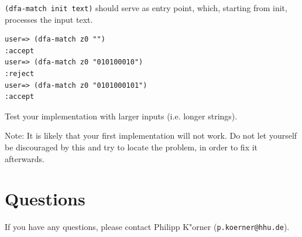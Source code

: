 \documentclass[11pt,a4paper]{article}
\begin{document}
\begin{exercise}[DFA]
\verb|(dfa-match init text)| should serve as entry point, which, starting from init, processes the input text.

\begin{verbatim}
user=> (dfa-match z0 "")
:accept
user=> (dfa-match z0 "010100010")
:reject
user=> (dfa-match z0 "0101000101")
:accept
\end{verbatim}


Test your implementation with larger inputs (i.e. longer strings).

Note: It is likely that your first implementation will not work.
Do not let yourself be discouraged by this and try to locate the problem,
in order to fix it afterwards.

\end{exercise}


\section*{Questions}
If you have any questions, please contact Philipp K"orner (\texttt{p.koerner@hhu.de}).
\end{document}
